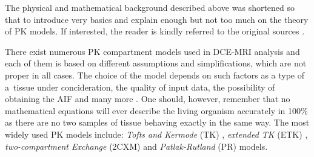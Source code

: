 The physical and mathematical background described above was shortened so that to introduce very basics and explain enough but not too much on the theory of PK models. If interested, the reader is kindly referred to the original sources \cite{sourbron2011scope, thesis}. 

There exist numerous PK compartment models used in DCE-MRI analysis and each of them is based on different assumptions and simplifications, which are not proper in all cases. The choice of the model depends on such factors as a type of a~tissue under concideration, the quality of input data, the possibility of obtaining the AIF and many more \cite{khalifa2014models}. One should, however, remember that no mathematical equations will ever describe the living organism accurately in 100\% as there are no two samples of tissue behaving exactly in the same way. The most widely used PK models include: \textit{Tofts and Kermode} (TK) \cite{tofts1991measurement}, \textit{extended TK} (ETK) \cite{tofts1997modeling}, \textit{two-compartment Exchange} (2CXM) \cite{khalifa2014models} and \textit{Patlak-Rutland} (PR) \cite{patlak1983graphical} models.  

